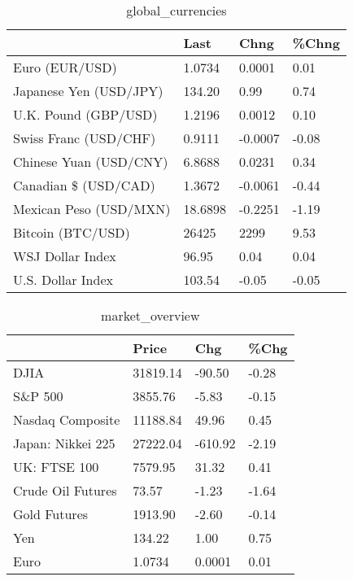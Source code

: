 \documentclass{article}%
\begin{document}
%


\begin{table}[htbp]%
\caption{global\_currencies}%
\centering%
\begin{adjustbox}{width=1\textwidth}%
\begin{tabular}{llll}
\toprule
                       &    Last &    Chng & \%Chng \\
\midrule
        Euro (EUR/USD) &  1.0734 &  0.0001 &  0.01 \\
Japanese Yen (USD/JPY) &  134.20 &    0.99 &  0.74 \\
  U.K. Pound (GBP/USD) &  1.2196 &  0.0012 &  0.10 \\
 Swiss Franc (USD/CHF) &  0.9111 & -0.0007 & -0.08 \\
Chinese Yuan (USD/CNY) &  6.8688 &  0.0231 &  0.34 \\
  Canadian \$ (USD/CAD) &  1.3672 & -0.0061 & -0.44 \\
Mexican Peso (USD/MXN) & 18.6898 & -0.2251 & -1.19 \\
     Bitcoin (BTC/USD) &   26425 &    2299 &  9.53 \\
      WSJ Dollar Index &   96.95 &    0.04 &  0.04 \\
     U.S. Dollar Index &  103.54 &   -0.05 & -0.05 \\
\bottomrule
\end{tabular}
%
\end{adjustbox}%
\end{table}

%


\begin{table}[htbp]%
\caption{market\_overview}%
\centering%
\begin{adjustbox}{width=1\textwidth}%
\begin{tabular}{llll}
\toprule
                  &    Price &     Chg &  \%Chg \\
\midrule
             DJIA & 31819.14 &  -90.50 & -0.28 \\
          S\&P 500 &  3855.76 &   -5.83 & -0.15 \\
 Nasdaq Composite & 11188.84 &   49.96 &  0.45 \\
Japan: Nikkei 225 & 27222.04 & -610.92 & -2.19 \\
     UK: FTSE 100 &  7579.95 &   31.32 &  0.41 \\
Crude Oil Futures &    73.57 &   -1.23 & -1.64 \\
     Gold Futures &  1913.90 &   -2.60 & -0.14 \\
              Yen &   134.22 &    1.00 &  0.75 \\
             Euro &   1.0734 &  0.0001 &  0.01 \\
\bottomrule
\end{tabular}
%
\end{adjustbox}%
\end{table}

%
\end{document}
